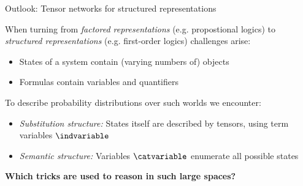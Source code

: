 \documentclass{beamer}
\begin{document}
    \begin{frame}{Outlook: Tensor networks for structured representations}

        When turning from \emph{factored representations} (e.g. propostional logics) to \emph{structured representations} (e.g. first-order logics) challenges arise:
        \begin{itemize}
            \item States of a system contain (varying numbers of) objects
            \item Formulas contain variables and quantifiers
        \end{itemize}

        \medskip

        To describe probability distributions over such worlds we encounter:
        \begin{itemize}
            \item \emph{Substitution structure:} States itself are described by tensors, using term variables $\indvariable$
            \item \emph{Semantic structure:} Variables $\catvariable$ enumerate all possible states
        \end{itemize}

        \begin{center}
            \bf Which tricks are used to reason in such large spaces?
        \end{center}

    \end{frame}
\end{document}
